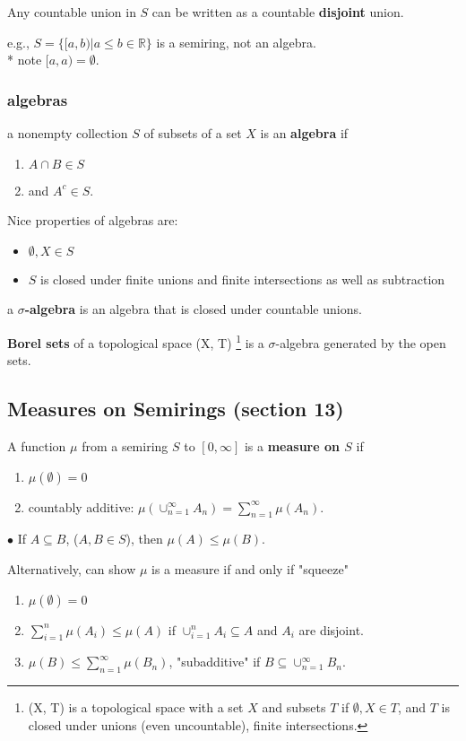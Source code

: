 \documentclass[a4paper, 12pt]{article}
\def\R{\ensuremath{\mathbb{R}}} %
\newcommand{\bt}[1]{\textbf{#1}} %
\begin{document}
\begin{multicols}{2}
Any countable union in $S$ can be written as a countable \bt{disjoint} union.

e.g., $S = \{[a, b) | a \leq b \in \R\}$ is a semiring, not an algebra. \\
* note $[a, a) = \emptyset$.


\subsubsection{algebras}

a nonempty collection $S$ of subsets of a set $X$ is an \bt{algebra} if 
\begin{enumerate}
    \item $A \cap B \in S$ 
    \item and $A^c \in S$. 
\end{enumerate}

Nice properties of algebras are: 
\begin{itemize}
    \item $\emptyset, X \in S$ 
    \item $S$ is closed under finite unions 
and finite intersections as well as subtraction
\end{itemize}

a \bt{$\sigma$-algebra} is an algebra that is closed under countable unions.

\bt{Borel sets} of a topological space (X, T) 
\footnote{(X, T) is a topological space with a set $X$ and subsets $T$ if
$\emptyset, X \in T$, and $T$ is closed under unions (even uncountable), finite intersections.}
is a $\sigma$-algebra 
generated by the open sets.

\subsection{Measures on Semirings (section 13)}
A function $\mu$ from a semiring $S$ to $[0, \infty]$ is a \bt{measure on $S$} if 
\begin{enumerate}
    \item $\mu(\emptyset) = 0$ 
    \item countably additive: $\mu(\cup_{n=1}^\infty A_n) = \sum_{n=1}^\infty \mu(A_n)$.
\end{enumerate}

\noindent $\bullet$ If $A \subseteq B$, ($A, B \in S$), then $\mu(A) \leq \mu(B)$.



Alternatively, can show $\mu$ is a measure if and only if "squeeze" 
\begin{enumerate}
    \item $\mu(\emptyset) = 0$
    \item $\sum_{i=1}^n \mu(A_i) \leq \mu(A)$ if $\cup_{i=1}^n A_i \subseteq A$ and $A_i$ are disjoint.
    \item $\mu(B) \leq \sum_{n=1}^\infty \mu(B_n)$, "subadditive"  if 
    $B \subseteq \cup_{n=1}^\infty B_n$.
\end{enumerate}


\end{multicols}
\end{document}
